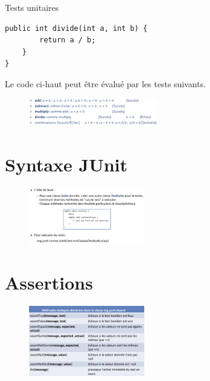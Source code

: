 \documentclass[16pt]{report}
\begin{document}
\begin{multicols*}{2}
\begin{EExample}{Tests unitaires}{}
\begin{lstlisting}[style=JavaDraculaWhite]
    public int divide(int a, int b) {
        return a / b;
    }
}   
\end{lstlisting}
        Le code ci-haut peut être évalué par les tests suivants. 
            
        \end{EExample}


        \begin{figure}[H]
            \begin{center}
                \includegraphics[width=0.5\textwidth]{ExTUnit.png}
            \end{center}
        \end{figure}


        \section{Syntaxe JUnit}

        \begin{figure}[H]
            \begin{center}
                \includegraphics[width=0.45\textwidth]{syntaxeJUnit.png}
            \end{center}
        \end{figure}


        \section{Assertions}



        \begin{figure}[H]
            \begin{center}
                \includegraphics[width=0.45\textwidth]{Assertions.png}
            \end{center}
        \end{figure}



\end{multicols*}
\end{document}
